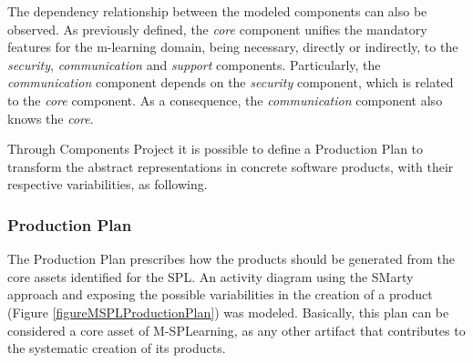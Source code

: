 The dependency relationship between the modeled components can also be observed. As previously defined, the \textit{core} component unifies the mandatory features for the m-learning domain, being necessary, directly or indirectly, to the \textit{security}, \textit{communication} and \textit{support} components. Particularly, the \textit{communication} component depends on the \textit{security} component, which is related to the \textit{core} component. As a consequence, the \textit{communication} component also knows the \textit{core}.

Through Components Project it is possible to define a Production Plan to transform the abstract representations in concrete software products, with their respective variabilities, as following.

\subsubsection{Production Plan}

The Production Plan prescribes how the products should be generated from the core assets identified for the SPL. An activity diagram using the SMarty approach and exposing the possible variabilities in the creation of a product (Figure \ref{figureMSPLProductionPlan}) was modeled. Basically, this plan can be considered a core asset of M-SPLear\allowbreak ning, as any other artifact that contributes to the systematic creation of its products.

